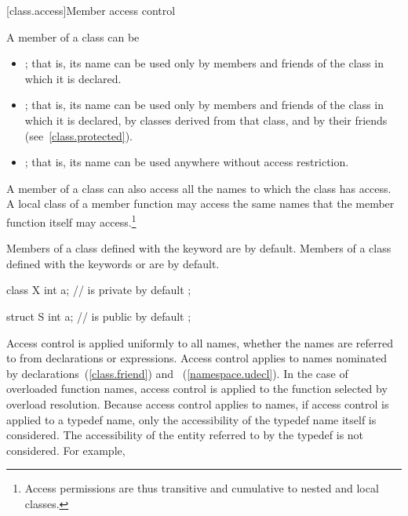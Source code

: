[class.access]{Member access control}%


\pnum
A member of a class can be
\begin{itemize}
\item
{}%
;
that is, its name can be used only by members and friends
of the class in which it is declared.
\item
{}%
;
that is, its name can be used only by members and friends
of the class in which it is declared, by classes derived from that class, and by their
friends (see~\ref{class.protected}).
\item
{}%
;
that is, its name can be used anywhere without access restriction.
\end{itemize}

\pnum
A member of a class can also access all the names to which the class has access.
A local class of a member function may access
the same names that the member function itself may access.\footnote{Access
permissions are thus transitive and cumulative to nested
and local classes.}

\pnum
{}%
%
%
Members of a class defined with the keyword
are
by default.
Members of a class defined with the keywords
or
are
by default.
\enterexample

\begin{codeblock}
class X {
  int a;            //  is private by default
};

struct S {
  int a;            //  is public by default
};
\end{codeblock}
\exitexample

\pnum
Access control is applied uniformly to all names, whether the names are
referred to from declarations or expressions.
\enternote
Access control applies to names nominated by
declarations~(\ref{class.friend}) and
~(\ref{namespace.udecl}).
\exitnote
In the case of overloaded function names, access control is applied to
the function selected by overload resolution.
\enternote
Because access control applies to names, if access control is applied to a
typedef name, only the accessibility of the typedef name itself is considered.
The accessibility of the entity referred to by the typedef is not considered.
For example,

